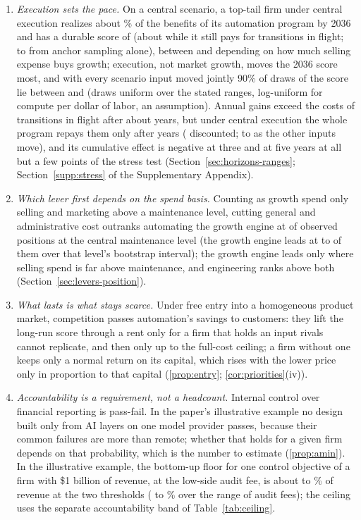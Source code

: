 \begin{center}
{\begin{minipage}{0.94\textwidth}
\begin{enumerate}[leftmargin=*,itemsep=1pt,topsep=2pt]
\item \emph{Execution sets the pace.} On a central scenario, a top-tail firm under central execution realizes about \PaceCenSix\% of the benefits of its automation program by 2036 and has a durable score of \CenRSix{} (about \CenRSixNet{} while it still pays for transitions in flight; \CenRSixLo{} to \CenRSixHi{} from anchor sampling alone), between \CenRSixNoSM{} and \CenRSixAllSM{} depending on how much selling expense buys growth; execution, not market growth, moves the 2036 score most, and with every scenario input moved jointly 90\% of draws of the score lie between \StNetSixPFive{} and \StNetSixPNinetyFive{} (draws uniform over the stated ranges, log-uniform for compute per dollar of labor, an assumption). Annual gains exceed the costs of transitions in flight after about \PayCrossCen{} years, but under central execution the whole program repays them only after \PayBackCen{} years (\PayBackDiscCen{} discounted; \StPayCenMin{} to \StPayCenMax{} as the other inputs move), and its cumulative effect is negative at three and at five years at all but a few points of the stress test (Section~\ref{sec:horizons-ranges}; Section~\ref{supp:stress} of the Supplementary Appendix).
\item \emph{Which lever first depends on the spend basis.} Counting as growth spend only selling and marketing above a maintenance level, cutting general and administrative cost outranks automating the growth engine at \lpNGACutFirstNet{} of \lpNPositions{} observed positions at the central maintenance level (the growth engine leads at \StLeverMin{} to \StLeverMax{} of them over that level's bootstrap interval); the growth engine leads only where selling spend is far above maintenance, and engineering ranks above both (Section~\ref{sec:levers-position}).
\item \emph{What lasts is what stays scarce.} Under free entry into a homogeneous product market, competition passes automation's savings to customers: they lift the long-run score through a rent only for a firm that holds an input rivals cannot replicate, and then only up to the full-cost ceiling; a firm without one keeps only a normal return on its capital, which rises with the lower price only in proportion to that capital (\autoref{prop:entry}; \autoref{cor:priorities}(iv)).
\item \emph{Accountability is a requirement, not a headcount.} Internal control over financial reporting is pass-fail. In the paper's illustrative example no design built only from AI layers on one model provider passes, because their common failures are more than remote; whether that holds for a given firm depends on that probability, which is the number to estimate (\autoref{prop:amin}). In the illustrative example, the bottom-up floor for one control objective of a firm with \$1 billion of revenue, at the low-side audit fee, is about \AminFloor{} to \AminFloorOne\% of revenue at the two thresholds (\AminFloorLo{} to \AminFloorHi\% over the range of audit fees); the ceiling uses the separate accountability band of Table~\ref{tab:ceiling}.

\end{enumerate}
\end{minipage}}
\end{center}
